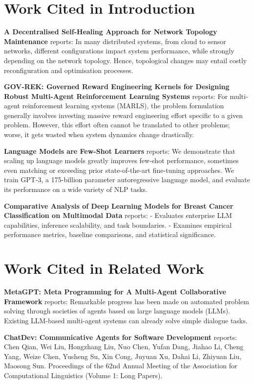 \documentclass[10pt,twocolumn,letterpaper]{article}
\begin{document}
\section{Work Cited in Introduction}


\textbf{A Decentralised Self-Healing Approach for Network Topology Maintenance} \cite{arxiv_2010_11146} reports: In many distributed systems, from cloud to sensor networks, different configurations impact system performance, while strongly depending on the network topology. Hence, topological changes may entail costly reconfiguration and optimisation processes.

\textbf{GOV-REK: Governed Reward Engineering Kernels for Designing Robust Multi-Agent Reinforcement Learning Systems} \cite{arxiv_2404_01131} reports: For multi-agent reinforcement learning systems (MARLS), the problem formulation generally involves investing massive reward engineering effort specific to a given problem. However, this effort often cannot be translated to other problems; worse, it gets wasted when system dynamics change drastically.

\textbf{Language Models are Few-Shot Learners} \cite{arxiv_2005_14165} reports: We demonstrate that scaling up language models greatly improves few-shot performance, sometimes even matching or exceeding prior state-of-the-art fine-tuning approaches. We train GPT-3, a 175-billion parameter autoregressive language model, and evaluate its performance on a wide variety of NLP tasks.

\textbf{Comparative Analysis of Deep Learning Models for Breast Cancer Classification on Multimodal Data} \cite{crossref_10_1145_3689096_3689462} reports: - Evaluates enterprise LLM capabilities, inference scalability, and task boundaries. - Examines empirical performance metrics, baseline comparisons, and statistical significance.


\section{Work Cited in Related Work}


\textbf{MetaGPT: Meta Programming for A Multi-Agent Collaborative Framework} \cite{crossref_10_48550_arxiv_2308_00352} reports: Remarkable progress has been made on automated problem solving through societies of agents based on large language models (LLMs). Existing LLM-based multi-agent systems can already solve simple dialogue tasks.

\textbf{ChatDev: Communicative Agents for Software Development} \cite{crossref_10_18653_v1_2024_acl_long_810} reports: Chen Qian, Wei Liu, Hongzhang Liu, Nuo Chen, Yufan Dang, Jiahao Li, Cheng Yang, Weize Chen, Yusheng Su, Xin Cong, Juyuan Xu, Dahai Li, Zhiyuan Liu, Maosong Sun. Proceedings of the 62nd Annual Meeting of the Association for Computational Linguistics (Volume 1: Long Papers).
\end{document}

